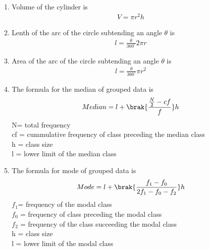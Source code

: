 \begin{enumerate}[label=\thesubsection.\arabic*, ref=\thesubsection.\theenumi]
\item
Volume of the cylinder is
\begin{align}
V = \pi r^2 h
\end{align}

\item
Lenth of the arc of the circle subtending an angle $\theta$ is
\begin{align}
l = \frac{\theta}{360^\circ}2\pi r \label{eq:EE26BTECH11211_Prob_3.14.10}
\end{align} 

\item
Area of the arc of the circle subtending an angle $\theta$ is
\begin{align}
l = \frac{\theta}{360^\circ}\pi r^2 \label{eq:EE26BTECH11211_Prob_3.15.10}
\end{align} 

\item
The formula for the median of grouped data is
\begin{align}
Median = l +\brak{\frac{\frac{N}{2} - cf}{f}}h \label{eq:EE26BTECH11211_Prob_3.16.10}
\end{align} 
N= total frequency
\\cf = cummulative frequency of class preceding the median class
\\h = class size
\\l = lower limit of the median class

\item
The formula for mode of grouped data is 
\begin{align}
Mode = l + \brak{\frac{f_1 - f_0}{2f_1 - f_0 -f_2}}h \label{eq:EE26BTECH11211_Prob_3.17.10}
\end{align}
$f_1 $= frequency of the modal class
\\$f_0$ = frequency of class preceding the modal class
\\$f_2$ = frequency of the class succeeding the modal class
\\h = class size
\\l = lower limit of the modal class

\end{enumerate}
